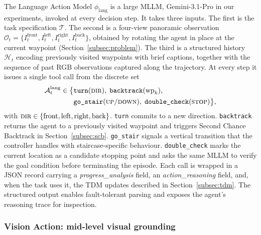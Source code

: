 \documentclass[conference]{IEEEtran}
\begin{document}
The Language Action Model $\phi_{\mathrm{lang}}$ is a large MLLM,
Gemini-3.1-Pro in our experiments, invoked at every decision step. It takes
three inputs. The first is the task specification $\mathcal{T}$. The second is
a four-view panoramic observation $\mathcal{O}_t = \{I^{\mathrm{front}}_t,
I^{\mathrm{left}}_t, I^{\mathrm{right}}_t, I^{\mathrm{back}}_t\}$, obtained by
rotating the agent in place at the current waypoint
(Section~\ref{subsec:problem}). The third is a structured history
$\mathcal{H}_t$ encoding previously visited waypoints with brief captions,
together with the sequence of past RGB observations captured along the
trajectory. At
every step it issues a single tool call from the discrete set
\begin{equation}
\begin{aligned}
\mathcal{A}^{\mathrm{lang}}_t \in \big\{
  &\texttt{turn}(\textsc{dir}),\;
   \texttt{backtrack}(\mathrm{wp}_k),\\
  &\texttt{go\_stair}(\textsc{up/down}),\;
   \texttt{double\_check}(\textsc{stop})\big\},
\end{aligned}
\label{eq:la_action_set}
\end{equation}
with $\textsc{dir} \in \{\mathrm{front},\mathrm{left},\mathrm{right},
\mathrm{back}\}$. \texttt{turn} commits to a new direction. \texttt{backtrack}
returns the agent to a previously visited waypoint and triggers Second Chance
Backtrack in Section~\ref{subsec:scb}. \texttt{go\_stair} signals a vertical
transition that the controller handles with staircase-specific behaviour.
\texttt{double\_check} marks the current location as a candidate stopping
point and asks the same MLLM to verify the goal condition before terminating
the episode. Each call is wrapped in a JSON record carrying a
\emph{progress\_analysis} field, an \emph{action\_reasoning} field, and, when
the task uses it, the TDM updates described in Section~\ref{subsec:tdm}. The
structured output enables fault-tolerant parsing and exposes the agent's
reasoning trace for inspection.

\subsubsection{Vision Action: mid-level visual grounding}
\end{document}
